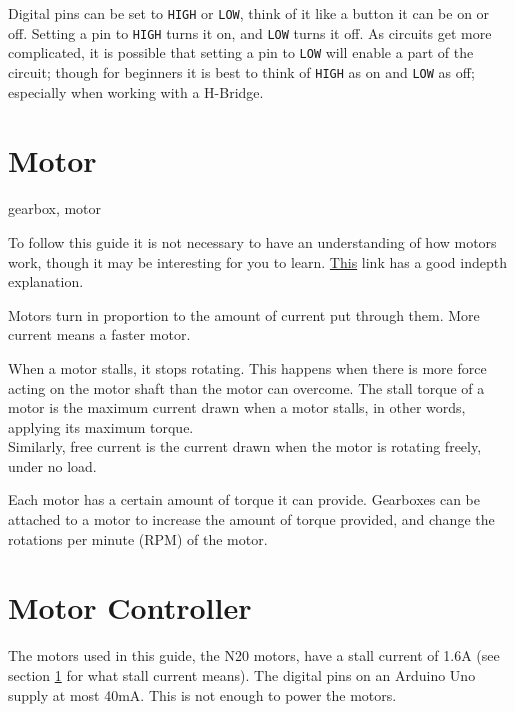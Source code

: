 \documentclass[a4paper,12pt]{article}
\begin{document}
Digital pins can be set to \lstinline[]!HIGH! or \lstinline[]!LOW!, think of it like a button it can be on or off. Setting a pin to \lstinline[]!HIGH! turns it on, and \lstinline[]!LOW! turns it off. As circuits get more complicated, it is possible that setting a pin to \lstinline[]!LOW! will enable a part of the circuit; though for beginners it is best to think of \lstinline[]!HIGH! as on and \lstinline[]!LOW! as off; especially when working with a H-Bridge. 

\newpage
\section{Motor} \label{sec:motor}
gearbox, motor

To follow this guide it is not necessary to have an understanding of how motors work, though it may be interesting for you to learn. \href{https://www.explainthatstuff.com/electricmotors.html}{This} link has a good indepth explanation.


Motors turn in proportion to the amount of current put through them. More current means a faster motor. 

When a motor stalls, it stops rotating. This happens when there is more force acting on the motor shaft than the motor can overcome. The stall torque of a motor is the maximum current drawn when a motor stalls, in other words, applying its maximum torque. \\


Similarly, free current is the current drawn when the motor is rotating freely, under no load. 

\bigskip


Each motor has a certain amount of torque it can provide. Gearboxes can be attached to a motor to increase the amount of torque provided, and change the rotations per minute (RPM) of the motor. 





\pagebreak
\section{Motor Controller} \label{sec:motorcontroller}

The motors used in this guide, the N20 motors, have a stall current of 1.6A (see section \ref{sec:motor} for what stall current means). The digital pins on an Arduino Uno supply at most 40mA. This is not enough to power the motors.\\ 
\end{document}
